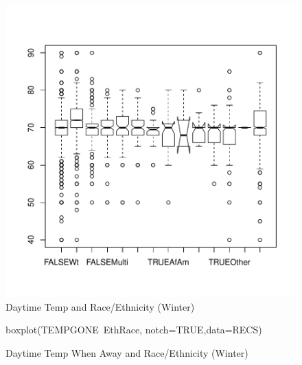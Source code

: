 \documentclass{article}
\begin{document}
\begin{figure}
\begin{center}
\caption{Daytime Temp and Race/Ethnicity (Winter)}
\label{fig:TempHomeRace}
\includegraphics{DraftEdwardsWoods-016}
\end{center}
\end{figure}

\begin{figure}
\begin{center}
\caption{Daytime Temp When Away and Race/Ethnicity (Winter)}
\label{fig:DayAwayRace}
boxplot(TEMPGONE~EthRace, notch=TRUE,data=RECS)
\end{center}
\end{figure}
\end{document}
